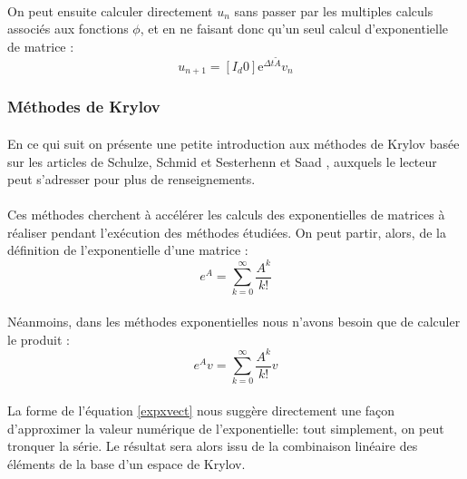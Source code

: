         \paragraph{}
On peut ensuite calculer directement $u_n$ sans passer par les multiples calculs associés aux fonctions $\phi$, et en ne faisant donc qu'un seul calcul d'exponentielle de matrice :
        \begin{equation} 
            u_{n+1}=\left[I_{d} 0\right] \mathrm{e}^{\Delta t \widetilde{A}} v_{n}
        \end{equation}

    \subsubsection{Méthodes de Krylov}
        \paragraph{}
        En ce qui suit on présente une petite introduction aux méthodes de Krylov basée sur les articles de Schulze, Schmid et Sesterhenn \cite{Krylov:1} et Saad \cite{Krylov:2}, auxquels le lecteur peut s'adresser pour plus de renseignements.

        \paragraph{}
        Ces méthodes cherchent à accélérer les calculs des exponentielles de matrices à réaliser pendant l'exécution des méthodes étudiées. On peut partir, alors, de la définition de l'exponentielle d'une matrice :%
        \begin{equation}
            e^{A}=\sum_{k=0}^{\infty} \frac{A^{k}}{k !}
        \end{equation}

        \paragraph{}
        Néanmoins, dans les méthodes exponentielles nous n'avons besoin que de calculer le produit :
        \begin{equation}
            e^{A}v=\sum_{k=0}^{\infty} \frac{A^{k}}{k !}v
            \label{expxvect}
        \end{equation}

        \paragraph{}
        La forme de l'équation \ref{expxvect} nous suggère directement une façon d'approximer la valeur numérique de l'exponentielle: tout simplement, on peut tronquer la série. Le résultat sera alors issu de la combinaison linéaire des éléments de la base d'un espace de Krylov.

